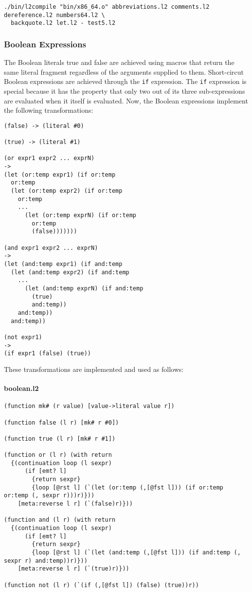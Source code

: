 \documentclass[]{article}
\let\oldparagraph\paragraph
\renewcommand{\paragraph}[1]{\oldparagraph{#1}\mbox{}}
\begin{document}
\begin{verbatim}
./bin/l2compile "bin/x86_64.o" abbreviations.l2 comments.l2 dereference.l2 numbers64.l2 \
  backquote.l2 let.l2 - test5.l2
\end{verbatim}

\hypertarget{boolean-expressions}{\subsubsection{Boolean
Expressions}\label{boolean-expressions}}

The Boolean literals true and false are achieved using macros that
return the same literal fragment regardless of the arguments supplied to
them. Short-circut Boolean expressions are achieved through the
\texttt{if} expression. The \texttt{if} expression is special because it
has the property that only two out of its three sub-expressions are
evaluated when it itself is evaluated. Now, the Boolean expressions
implement the following transformations:

\begin{verbatim}
(false) -> (literal #0)

(true) -> (literal #1)

(or expr1 expr2 ... exprN)
->
(let (or:temp expr1) (if or:temp
  or:temp
  (let (or:temp expr2) (if or:temp
    or:temp
    ...
      (let (or:temp exprN) (if or:temp
        or:temp
        (false)))))))

(and expr1 expr2 ... exprN)
->
(let (and:temp expr1) (if and:temp
  (let (and:temp expr2) (if and:temp
    ...
      (let (and:temp exprN) (if and:temp
        (true)
        and:temp))
    and:temp))
  and:temp))

(not expr1)
->
(if expr1 (false) (true))
\end{verbatim}

These transformations are implemented and used as follows:

\paragraph{boolean.l2}\label{boolean.l2}

\begin{verbatim}
(function mk# (r value) [value->literal value r])

(function false (l r) [mk# r #0])

(function true (l r) [mk# r #1])

(function or (l r) (with return
  {(continuation loop (l sexpr)
      (if [emt? l]
        {return sexpr}
        {loop [@rst l] (`(let (or:temp (,[@fst l])) (if or:temp or:temp (, sexpr r)))r)}))
    [meta:reverse l r] (`(false)r)}))

(function and (l r) (with return
  {(continuation loop (l sexpr)
      (if [emt? l]
        {return sexpr}
        {loop [@rst l] (`(let (and:temp (,[@fst l])) (if and:temp (, sexpr r) and:temp))r)}))
    [meta:reverse l r] (`(true)r)}))

(function not (l r) (`(if (,[@fst l]) (false) (true))r))
\end{verbatim}
\end{document}
